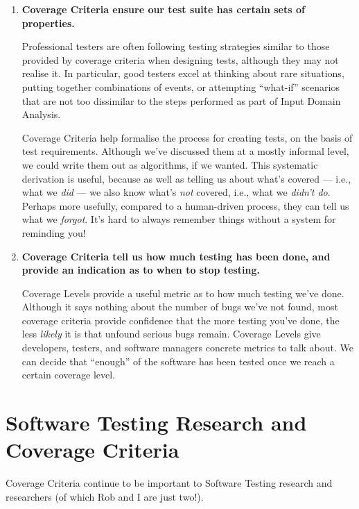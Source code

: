 \begin{enumerate}

    \item {\bf Coverage Criteria ensure our test suite has certain sets of 
    properties.}
       
    Professional testers are often following testing strategies similar to those
    provided by coverage criteria when designing tests, although they may not
    realise it. In particular, good testers excel at thinking about rare
    situations, putting together combinations of events, or attempting
    ``what-if'' scenarios that are not too dissimilar to the steps performed as
    part of Input Domain Analysis.
    
    Coverage Criteria help formalise the process for creating tests, on the
    basis of test requirements. Although we've discussed them at a mostly
    informal level, we could write them out as algorithms, if we wanted.
    This systematic derivation is useful, because as well as telling us about
    what's covered --- i.e., what we {\it did} --- we also know what's {\it not}
    covered, i.e., what we {\it didn't do}. Perhaps more usefully, compared to a
    human-driven process, they can tell us what we {\it forgot}. It's hard to
    always remember things without a system for reminding you!

    \item {\bf Coverage Criteria tell us how much testing has been done, 
    and provide an indication as to when to stop testing.}
    
    Coverage Levels provide a useful metric as to how much testing we've done.
    Although it says nothing about the number of bugs we've not found, most
    coverage criteria provide confidence that the more testing you've done, the
    less {\it likely} it is that unfound serious bugs remain. Coverage Levels
    give developers, testers, and software managers concrete metrics to talk
    about. We can decide that ``enough'' of the software has been tested once we
    reach a certain coverage level.

\end{enumerate}

\section{Software Testing Research and Coverage Criteria}

Coverage Criteria continue to be important to Software Testing research and
researchers (of which Rob and I are just two!).

